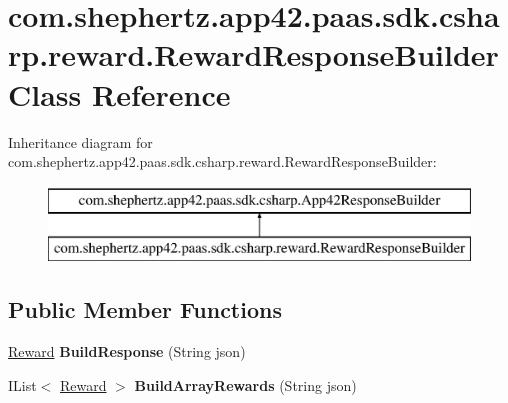 \hypertarget{classcom_1_1shephertz_1_1app42_1_1paas_1_1sdk_1_1csharp_1_1reward_1_1_reward_response_builder}{\section{com.\+shephertz.\+app42.\+paas.\+sdk.\+csharp.\+reward.\+Reward\+Response\+Builder Class Reference}
\label{classcom_1_1shephertz_1_1app42_1_1paas_1_1sdk_1_1csharp_1_1reward_1_1_reward_response_builder}
}
Inheritance diagram for com.\+shephertz.\+app42.\+paas.\+sdk.\+csharp.\+reward.\+Reward\+Response\+Builder\+:\begin{figure}[H]
\begin{center}
\leavevmode
\includegraphics[height=2.000000cm]{classcom_1_1shephertz_1_1app42_1_1paas_1_1sdk_1_1csharp_1_1reward_1_1_reward_response_builder}
\end{center}
\end{figure}
\subsection*{Public Member Functions}
\begin{DoxyCompactItemize}
\item 
\hypertarget{classcom_1_1shephertz_1_1app42_1_1paas_1_1sdk_1_1csharp_1_1reward_1_1_reward_response_builder_ac87464e6ed23207a72c0341f1be47e4e}{\hyperlink{classcom_1_1shephertz_1_1app42_1_1paas_1_1sdk_1_1csharp_1_1reward_1_1_reward}{Reward} {\bfseries Build\+Response} (String json)}\label{classcom_1_1shephertz_1_1app42_1_1paas_1_1sdk_1_1csharp_1_1reward_1_1_reward_response_builder_ac87464e6ed23207a72c0341f1be47e4e}

\item 
\hypertarget{classcom_1_1shephertz_1_1app42_1_1paas_1_1sdk_1_1csharp_1_1reward_1_1_reward_response_builder_a868b5c5aa7106832e0eea69f15955ac2}{I\+List$<$ \hyperlink{classcom_1_1shephertz_1_1app42_1_1paas_1_1sdk_1_1csharp_1_1reward_1_1_reward}{Reward} $>$ {\bfseries Build\+Array\+Rewards} (String json)}\label{classcom_1_1shephertz_1_1app42_1_1paas_1_1sdk_1_1csharp_1_1reward_1_1_reward_response_builder_a868b5c5aa7106832e0eea69f15955ac2}

\end{DoxyCompactItemize}
